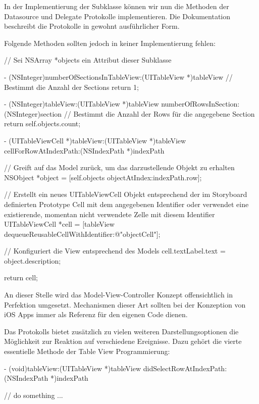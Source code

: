 \documentclass[parskip=half, final]{scrreprt}
\begin{document}
In der Implementierung der  Subklasse können wir nun die Methoden der Datasource und Delegate Protokolle implementieren. Die Dokumentation beschreibt die Protokolle in gewohnt ausführlicher Form.

Folgende Methoden sollten jedoch in keiner  Implementierung fehlen:

\begin{objclst}
// Sei NSArray *objects ein Attribut dieser Subklasse

- (NSInteger)numberOfSectionsInTableView:(UITableView *)tableView {
    // Bestimmt die Anzahl der Sections
    return 1;
}

- (NSInteger)tableView:(UITableView *)tableView numberOfRowsInSection:(NSInteger)section {
    // Bestimmt die Anzahl der Rows für die angegebene Section
    return self.objects.count;
}

- (UITableViewCell *)tableView:(UITableView *)tableView cellForRowAtIndexPath:(NSIndexPath *)indexPath {

    // Greift auf das Model zurück, um das darzustellende Objekt zu erhalten
    NSObject *object = [self.objects objectAtIndex:indexPath.row];

    // Erstellt ein neues UITableViewCell Objekt entsprechend der im Storyboard definierten Prototype Cell mit dem angegebenen Identifier oder verwendet eine existierende, momentan nicht verwendete Zelle mit diesem Identifier
    UITableViewCell *cell = [tableView dequeueReusableCellWithIdentifier:@"objectCell"];

    // Konfiguriert die View entsprechend des Models
    cell.textLabel.text = object.description;

    return cell;
}
\end{objclst}

An dieser Stelle wird das Model-View-Controller Konzept  offensichtlich in Perfektion umgesetzt. Mechanismen dieser Art sollten bei der Konzeption von iOS Apps immer als Referenz für den eigenen Code dienen.

Das  Protokolls bietet zusätzlich zu vielen weiteren Darstellungsoptionen die Möglichkeit zur Reaktion auf verschiedene Ereignisse. Dazu gehört die vierte essentielle Methode der Table View Programmierung:

\begin{objclst}
- (void)tableView:(UITableView *)tableView didSelectRowAtIndexPath:(NSIndexPath *)indexPath {

    // do something ...    
    
}
\end{objclst}
\end{document}
